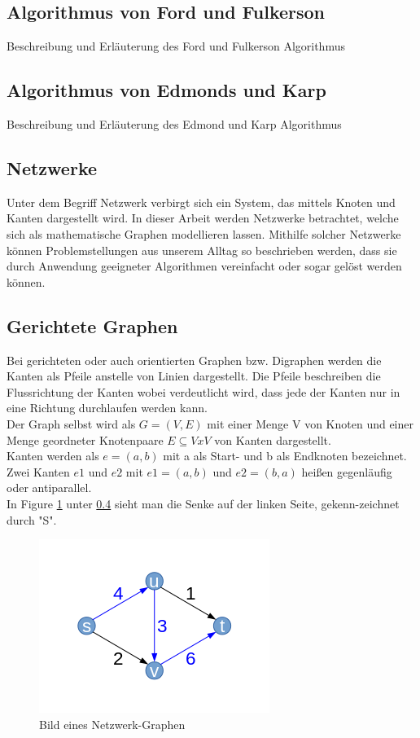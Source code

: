 \documentclass[runningheads,a4paper]{llncs}
\begin{document}
\subsection{Algorithmus von Ford und Fulkerson}
Beschreibung und Erläuterung des Ford und Fulkerson Algorithmus

\subsection{Algorithmus von Edmonds und Karp}
Beschreibung und Erläuterung des Edmond und Karp Algorithmus

\subsection{Netzwerke}
\label{Netzwerke}
Unter dem Begriff Netzwerk verbirgt sich ein System, das mittels Knoten und Kanten dargestellt wird.  In dieser Arbeit werden Netzwerke betrachtet, welche sich als mathematische Graphen modellieren lassen. Mithilfe solcher Netzwerke können Problemstellungen aus unserem Alltag so beschrieben werden, dass sie durch Anwendung geeigneter Algorithmen vereinfacht oder sogar gelöst werden können.


\subsection{Gerichtete Graphen}
\label{Graph}
Bei gerichteten oder auch orientierten Graphen bzw. Digraphen werden die Kanten als Pfeile anstelle von Linien dargestellt. Die Pfeile beschreiben die Flussrichtung der Kanten wobei verdeutlicht wird, dass jede der Kanten nur in eine Richtung durchlaufen werden kann.\\

Der Graph selbst wird als
$G = (V,E)$ mit einer Menge V von Knoten und einer Menge
geordneter Knotenpaare $E \subseteq V x V$ von Kanten dargestellt.\\

Kanten werden als 
$e = (a,b)$
mit a als Start- und b als Endknoten bezeichnet.
Zwei Kanten $e1$ und $e2$ mit 
$e1 = (a,b)$ und $e2 = (b,a)$
heißen gegenläufig oder antiparallel.\\

In Figure \ref{fig:Graph1} unter \ref{Graph} sieht man die Senke auf der linken Seite, gekenn-zeichnet durch "S". 

\begin{figure}[htbp] 
  \centering
     \includegraphics{graph1} 
  \caption{Bild eines Netzwerk-Graphen}
  \label{fig:Graph1}
\end{figure}
\end{document}
